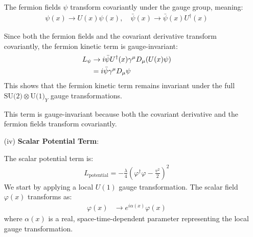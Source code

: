 \begin{enumerate}
The fermion fields $\psi$ transform covariantly under the gauge group, meaning:
\begin{align}
    \psi(x) \to U(x) \psi(x), \quad \bar{\psi}(x) \to \bar{\psi}(x) U^\dagger(x)
\end{align}

Since both the fermion fields and the covariant derivative transform covariantly, the fermion kinetic term is gauge-invariant:
\begin{align}
    L_{\psi} &\to i \bar{\psi} U^\dagger(x) \gamma^\mu D_\mu (U(x) \psi) \notag \\
    &= i \bar{\psi} \gamma^\mu D_\mu \psi
\end{align}
This shows that the fermion kinetic term remains invariant under the full $\text{SU(2)} \otimes \text{U(1)}_Y$ gauge transformations.



This term is gauge-invariant because both the covariant derivative and the fermion fields transform covariantly.
\item [(iv)] \textbf{Scalar Potential Term}:

The scalar potential term is:
\begin{align}
    L_{\text{potential}} = - \frac{\lambda}{4} \left( \varphi^\dagger \varphi - \frac{v^2}{2} \right)^2\label{eq:L-scalar-potential}
\end{align}
We start by applying a local $U(1)$ gauge transformation. The scalar field $\varphi(x)$ transforms as:
\begin{align}
    \varphi(x) &\to e^{\displaystyle i \alpha(x)} \varphi(x)\label{eq:phi-potential-transformation}
\end{align}
where $\alpha(x)$ is a real, space-time-dependent parameter representing the local gauge transformation.


\end{enumerate}
